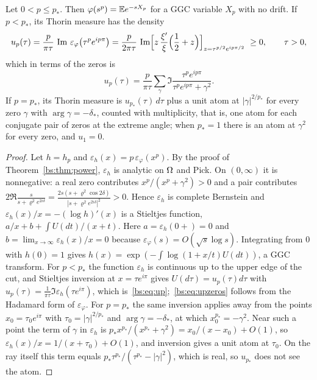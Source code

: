 \begin{theorem}\label{bs:thm:ggc}
Let $0<p\le p_*$. Then $\varphi(s^p)=\mathbb{E} e^{-sX_p}$ for a GGC variable $X_p$ with no drift. If $p<p_*$, its Thorin measure has the density
\begin{equation}\label{bs:eq:up}
u_p(\tau)=\frac{p}{\pi\tau}\,\Im\,\varepsilon_\varphi\bigl(\tau^pe^{ip\pi}\bigr)
=\frac{p}{2\pi\tau}\,\Im\Bigl[z\,\frac{\xi'}{\xi}\Bigl(\frac12+z\Bigr)\Bigr]_{z=\tau^{p/2}e^{ip\pi/2}}\ \ge0,\qquad\tau>0,
\end{equation}
which in terms of the zeros is
\begin{equation}\label{bs:eq:upzeros}
u_p(\tau)=\frac{p}{\pi\tau}\sum_\gamma\Im\frac{\tau^pe^{ip\pi}}{\tau^pe^{ip\pi}+\gamma^2}.
\end{equation}
If $p=p_*$, its Thorin measure is $u_{p_*}(\tau)\,d\tau$ plus a unit atom at $|\gamma|^{2/p_*}$ for every zero $\gamma$ with $\arg\gamma=-\delta_*$, counted with multiplicity, that is, one atom for each conjugate pair of zeros at the extreme angle; when $p_*=1$ there is an atom at $\gamma^2$ for every zero, and $u_1=0$.
\end{theorem}

\begin{proof}
Let $h=h_p$ and $\varepsilon_h(x)=p\,\varepsilon_\varphi(x^p)$. By the proof of Theorem~\ref{bs:thm:power}, $\varepsilon_h$ is analytic on $\Omega$ and Pick. On $(0,\infty)$ it is nonnegative: a real zero contributes $x^p/(x^p+\gamma^2)>0$ and a pair contributes $2\Re\frac{s}{s+\varrho^2e^{2i\delta}}=\frac{2s(s+\varrho^2\cos2\delta)}{|s+\varrho^2e^{2i\delta}|^2}>0$. Hence $\varepsilon_h$ is complete Bernstein and $\varepsilon_h(x)/x=-(\log h)'(x)$ is a Stieltjes function, $a/x+b+\int U(dt)/(x+t)$. Here $a=\varepsilon_h(0+)=0$ and $b=\lim_{x\to\infty}\varepsilon_h(x)/x=0$ because $\varepsilon_\varphi(s)=O(\sqrt s\log s)$. Integrating from $0$ with $h(0)=1$ gives $h(x)=\exp(-\int\log(1+x/t)U(dt))$, a GGC transform. For $p<p_*$ the function $\varepsilon_h$ is continuous up to the upper edge of the cut, and Stieltjes inversion at $x=\tau e^{i\pi}$ gives $U(d\tau)=u_p(\tau)d\tau$ with $u_p(\tau)=\frac1{\pi\tau}\Im\varepsilon_h(\tau e^{i\pi})$, which is~\eqref{bs:eq:up};~\eqref{bs:eq:upzeros} follows from the Hadamard form of $\varepsilon_\varphi$. For $p=p_*$ the same inversion applies away from the points $x_0=\tau_0e^{i\pi}$ with $\tau_0=|\gamma|^{2/p_*}$ and $\arg\gamma=-\delta_*$, at which $x_0^{p_*}=-\gamma^2$. Near such a point the term of $\gamma$ in $\varepsilon_h$ is $p_*x^{p_*}/(x^{p_*}+\gamma^2)=x_0/(x-x_0)+O(1)$, so $\varepsilon_h(x)/x=1/(x+\tau_0)+O(1)$, and inversion gives a unit atom at $\tau_0$. On the ray itself this term equals $p_*\tau^{p_*}/(\tau^{p_*}-|\gamma|^2)$, which is real, so $u_{p_*}$ does not see the atom.
\end{proof}

